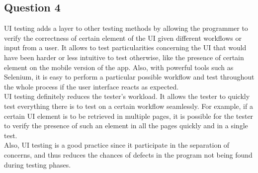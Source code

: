 \subsection*{Question 4}

\noindent UI testing adds a layer to other testing methods by allowing the programmer to verify the correctness of certain element of the UI given different workflows or input from a user. It allows to test particularities concerning the UI that would have been harder or less intuitive to test otherwise, like the presence of certain element on the mobile version of the app. Also, with powerful tools such as Selenium, it is easy to perform a particular possible workflow and test throughout the whole process if the user interface reacts as expected. \\ UI testing definitely reduces the tester's workload. It allows the tester to quickly test everything there is to test on a certain workflow seamlessly. For example, if a certain UI element is to be retrieved in multiple pages, it is possible for the tester to verify the presence of such an element in all the pages quickly and in a single test.\\ Also, UI testing is a good practice since it participate in the separation of concerns, and thus reduces the chances of defects in the program not being found during testing phases. 